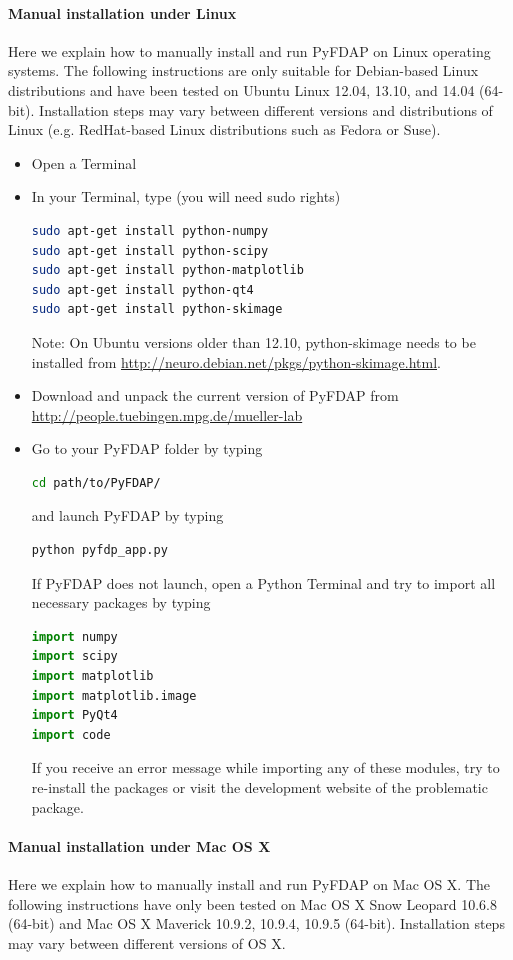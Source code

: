 \documentclass[a4paper,11pt]{article}
\begin{document}
\paragraph{Manual installation under Linux}
Here we explain how to manually install and run PyFDAP on Linux operating systems. The following instructions are only suitable for Debian-based Linux distributions and have been tested on Ubuntu Linux 12.04, 13.10, and 14.04 (64-bit). Installation steps may vary between different versions and distributions of Linux (e.g. RedHat-based Linux distributions such as Fedora or Suse). 

\begin{itemize}
 \item Open a Terminal
 \item In your Terminal, type (you will need sudo rights)
 \begin{lstlisting}[frame=single,language=bash]  
sudo apt-get install python-numpy
sudo apt-get install python-scipy
sudo apt-get install python-matplotlib
sudo apt-get install python-qt4
sudo apt-get install python-skimage
\end{lstlisting}
Note: On Ubuntu versions older than 12.10, python-skimage needs to be installed from \url{http://neuro.debian.net/pkgs/python-skimage.html}.
\item  Download and unpack the current version of PyFDAP from \url{http://people.tuebingen.mpg.de/mueller-lab}
 \item Go to your PyFDAP folder by typing 
\begin{lstlisting}[frame=single,language=bash]  
cd path/to/PyFDAP/
\end{lstlisting}
and launch PyFDAP by typing
\begin{lstlisting}[frame=single,language=bash]  
python pyfdp_app.py
\end{lstlisting}
If PyFDAP does not launch, open a Python Terminal and try to import all necessary packages by typing
\begin{lstlisting}[frame=single,language=Python]  
import numpy
import scipy
import matplotlib
import matplotlib.image
import PyQt4
import code
\end{lstlisting}
If you receive an error message while importing any of these modules, try to re-install the packages or visit the development website of the problematic package.\\

\end{itemize}

\paragraph{Manual installation under Mac OS X}
\label{sec:macos}
Here we explain how to  manually install and run PyFDAP on Mac OS X. The following instructions have only been tested on Mac OS X Snow Leopard 10.6.8 (64-bit) and Mac OS X Maverick 10.9.2, 10.9.4, 10.9.5 (64-bit). Installation steps may vary between different versions of OS X.
\end{document}
